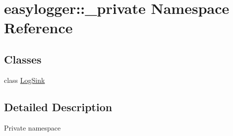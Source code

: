 \hypertarget{namespaceeasylogger_1_1__private}{}\section{easylogger\+:\+:\+\_\+private Namespace Reference}
\label{namespaceeasylogger_1_1__private}
\subsection*{Classes}
\begin{DoxyCompactItemize}
\item 
class \mbox{\hyperlink{classeasylogger_1_1__private_1_1_log_sink}{Log\+Sink}}
\end{DoxyCompactItemize}


\subsection{Detailed Description}
Private namespace 